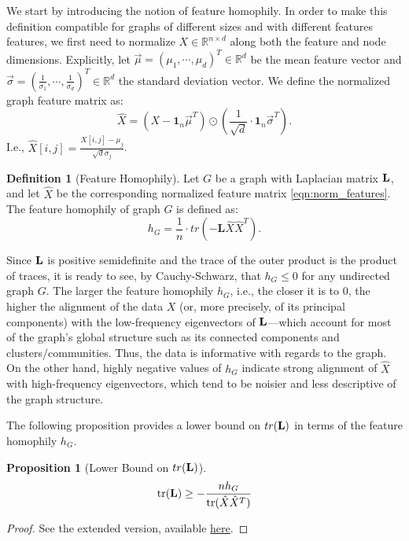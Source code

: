 \documentclass[conference]{IEEEtran}
\newtheorem{proposition}[theorem]{Proposition} %
\theoremstyle{definition}
\newtheorem{definition}[theorem]{Definition} %
\begin{document}
We start by introducing the notion of feature homophily.
In order to make this definition compatible for graphs of different sizes and with different features features, we first need to normalize $X \in \mathbb{R}^{n\times d}$ along both the feature and node dimensions. Explicitly, let $\Vec{\mu} = (\mu_1, \cdots, \mu_d)^T \in \mathbb{R}^d$ be the mean feature vector and $\Vec{\sigma} = (\frac{1}{\sigma_1}, \cdots, \frac{1}{\sigma_d})^T \in \mathbb{R}^d$ the standard deviation vector. We define the normalized graph feature matrix as:
\begin{equation} \label{eqn:norm_features}
    \hat{X} = (X - \mathbf{1}_n \Vec{\mu}^T) \odot (\frac{1}{\sqrt{d}} \cdot \mathbf{1}_n \Vec{\sigma}^T) \text{.}
\end{equation}
I.e., $\hat{X}[i,j] = \frac{X[i,j] - \mu_j}{\sqrt{d}\sigma_j}$. 

\begin{definition}[Feature Homophily] \label{def:feature_homophily}
    Let $G$ be a graph with Laplacian matrix ${\mathbf L}$, and let $\hat{X}$ be the corresponding normalized feature matrix \eqref{eqn:norm_features}. The feature homophily of graph $G$ is defined as:
    \begin{equation} \label{eqn:feature_homophily}
        h_G = \frac{1}{n} \cdot {tr}(-\mathbf{L}\hat{X}\hat{X}^T)\text{.}
    \end{equation}
\end{definition}

Since ${\mathbf L}$ is positive semidefinite and the trace of the outer product is the product of traces, it is ready to see, by Cauchy-Schwarz, that $h_G \leq 0$ for any undirected graph $G$. The larger the feature homophily $h_G$, i.e., the closer it is to $0$, the higher the alignment of the data $X$ (or, more precisely, of its principal components) with the low-frequency eigenvectors of ${\mathbf L}$---which account for most of the graph's global structure such as its connected components and clusters/communities. Thus, the data is informative with regards to the graph. On the other hand, highly negative values of $h_G$ indicate strong alignment of $\hat{X}$ with high-frequency eigenvectors, which tend to be noisier and less descriptive of the graph structure.

The following proposition provides a lower bound on ${tr}({\mathbf L})$ in terms of the feature homophily $h_G$.
\begin{proposition}[Lower Bound on ${tr}({\mathbf L})$]
    \label{bound on tr L}
    \begin{equation} \label{eqn:bound_tr_L}
        \text{tr}(\bbL) \geq - \frac{nh_G}{\text{tr}(\hat{X}\hat{X}^T)}
    \end{equation}
\end{proposition}
\begin{proof}
See the extended version, available \href{https://github.com/JamesLi128/Graph-Sampling-for-Scalable-and-Expressive-Graph-Neural-Networks-on-Homophilic-Graphs/blob/master/main.pdf}{here}.
\end{proof}
\end{document}
